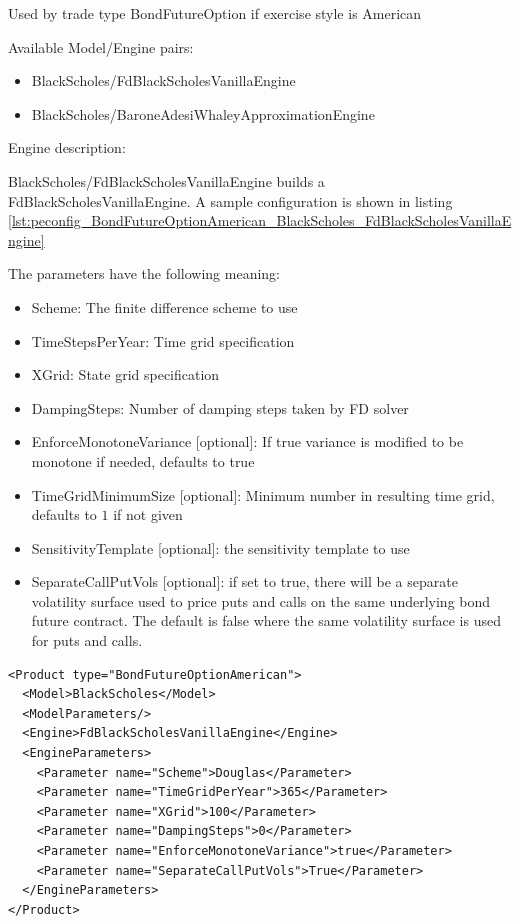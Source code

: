 Used by trade type BondFutureOption if exercise style is American

Available Model/Engine pairs:

\begin{itemize}
\item BlackScholes/FdBlackScholesVanillaEngine
\item BlackScholes/BaroneAdesiWhaleyApproximationEngine
\end{itemize}

Engine description:

BlackScholes/FdBlackScholesVanillaEngine builds a FdBlackScholesVanillaEngine. A sample configuration is shown in listing
\ref{lst:peconfig_BondFutureOptionAmerican_BlackScholes_FdBlackScholesVanillaEngine}

The parameters have the following meaning:

\begin{itemize}
\item Scheme: The finite difference scheme to use
\item TimeStepsPerYear: Time grid specification
\item XGrid: State grid specification
\item DampingSteps: Number of damping steps taken by FD solver
\item EnforceMonotoneVariance [optional]: If true variance is modified to be monotone if needed, defaults to true
\item TimeGridMinimumSize [optional]: Minimum number in resulting time grid, defaults to $1$ if not given
\item SensitivityTemplate [optional]: the sensitivity template to use
\item SeparateCallPutVols [optional]: if set to true, there will be a separate volatility surface 
    used to price puts and calls on the same underlying bond future contract. The default is false 
    where the same volatility surface is used for puts and calls.
\end{itemize}

\begin{longlisting}
\begin{verbatim}
<Product type="BondFutureOptionAmerican">
  <Model>BlackScholes</Model>
  <ModelParameters/>
  <Engine>FdBlackScholesVanillaEngine</Engine>
  <EngineParameters>
    <Parameter name="Scheme">Douglas</Parameter>
    <Parameter name="TimeGridPerYear">365</Parameter>
    <Parameter name="XGrid">100</Parameter>
    <Parameter name="DampingSteps">0</Parameter>
    <Parameter name="EnforceMonotoneVariance">true</Parameter>
    <Parameter name="SeparateCallPutVols">True</Parameter>
  </EngineParameters>
</Product>
\end{verbatim}
\caption{Configuration for Product BondFutureOptionAmerican, Model BlackScholes, Engine FdBlackScholesVanillaEngine}
\label{lst:peconfig_BondFutureOptionAmerican_BlackScholes_FdBlackScholesVanillaEngine}
\end{longlisting}


